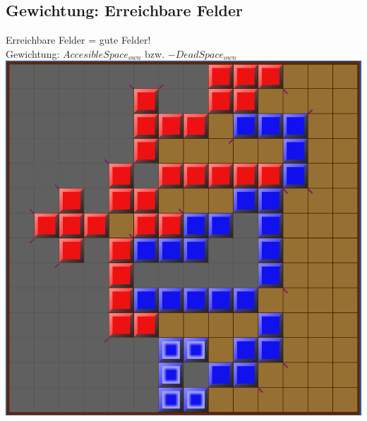 \documentclass[12pt, draft]{beamer}
\begin{document}
\subsection{Gewichtung: Erreichbare Felder}
\begin{frame}
	Erreichbare Felder = gute Felder!\\
	\pause
	Gewichtung: $AccesibleSpace_{own}$ bzw. $- DeadSpace_{own}$
	\pause
	\includegraphics[width=0.6\linewidth]{media/wgh15.png}
\end{frame}
\end{document}
